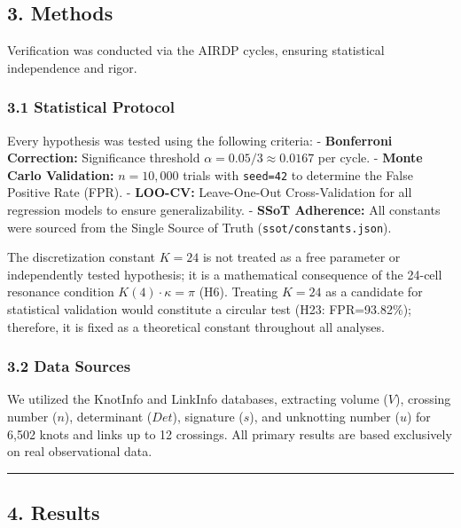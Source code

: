 \documentclass[
]{article}
\begin{document}
\subsection{3. Methods}\label{methods}

Verification was conducted via the AIRDP cycles, ensuring statistical
independence and rigor.

\subsubsection{3.1 Statistical Protocol}\label{statistical-protocol}

Every hypothesis was tested using the following criteria: -
\textbf{Bonferroni Correction:} Significance threshold
\(\alpha = 0.05 / 3 \approx 0.0167\) per cycle. - \textbf{Monte Carlo
Validation:} \(n=10,000\) trials with \texttt{seed=42} to determine the
False Positive Rate (FPR). - \textbf{LOO-CV:} Leave-One-Out
Cross-Validation for all regression models to ensure generalizability. -
\textbf{SSoT Adherence:} All constants were sourced from the Single
Source of Truth (\texttt{ssot/constants.json}).

The discretization constant \(K=24\) is not treated as a free parameter
or independently tested hypothesis; it is a mathematical consequence of
the 24-cell resonance condition \(K(4)\cdot\kappa=\pi\) (H6). Treating
\(K=24\) as a candidate for statistical validation would constitute a
circular test (H23: FPR=93.82\%); therefore, it is fixed as a
theoretical constant throughout all analyses.

\subsubsection{3.2 Data Sources}\label{data-sources}

We utilized the KnotInfo and LinkInfo databases, extracting volume
(\(V\)), crossing number (\(n\)), determinant (\(Det\)), signature
(\(s\)), and unknotting number (\(u\)) for 6,502 knots and links up to
12 crossings. All primary results are based exclusively on real
observational data.

\begin{center}\rule{0.5\linewidth}{0.5pt}\end{center}

\subsection{4. Results}\label{results}
\end{document}
